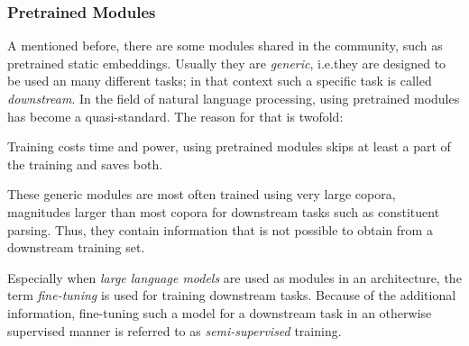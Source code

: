 \documentclass[../document.tex]{subfiles}
\begin{document}
    \subsubsection{Pretrained Modules}
    A mentioned before, there are some modules shared in the community, such as pretrained static embeddings.
    Usually they are \emph{generic}, i.e.\@ they are designed to be used an many different tasks; in that context such a specific task is called \emph{downstream}.
    In the field of natural language processing, using pretrained modules has become a quasi-standard.
    The reason for that is twofold:
    \begin{compactitem}
        \item
            Training costs time and power, using pretrained modules skips at least a part of the training and saves both.
        \item
            These generic modules are most often trained using very large copora, magnitudes larger than most copora for downstream tasks such as constituent parsing.
            Thus, they contain information that is not possible to obtain from a downstream training set.
    \end{compactitem}
    Especially when \emph{large language models} are used as modules in an architecture, the term \emph{fine-tuning} is used for training downstream tasks.
    Because of the additional information, fine-tuning such a model for a downstream task in an otherwise supervised manner is referred to as \emph{semi-supervised} training.
\end{document}
